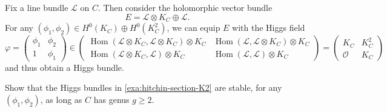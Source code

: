 \documentclass[12pt,letterpaper,reqno]{article}
\numberwithin{equation}{section}
\newcommand{\cL}{\ensuremath{\mathcal L}}
\newcommand{\cO}{\ensuremath{\mathcal O}}
\newcommand{\Z}{\ensuremath{\mathbb Z}}
\newcommand{\ti}[1]{\textit{#1}}
\DeclareMathOperator{\Hom}{Hom}
\begin{document}



\begin{example} \label{exa:hitchin-section-K2} 
Fix a line bundle
$\cL$ on $C$.
Then consider the holomorphic vector
bundle
\begin{equation}
  E = \cL \otimes K_C \oplus \cL.
\end{equation}
For any $(\phi_1, \phi_2) \in H^0(K_C) \oplus H^0(K_C^2)$,
we can equip $E$ with the Higgs field
\begin{equation}
  \varphi = \begin{pmatrix} \phi_1 & \phi_2 \\ 1 & \phi_1 \end{pmatrix} \in \begin{pmatrix} \Hom(\cL \otimes K_C,\cL \otimes K_C) \otimes K_C & \Hom(\cL,\cL \otimes K_C) \otimes K_C \\ \Hom(\cL \otimes K_C,\cL) \otimes K_C & \Hom(\cL,\cL) \otimes K_C \end{pmatrix} = \begin{pmatrix} K_C & K_C^2 \\ \cO & K_C \end{pmatrix}
\end{equation}
and thus obtain a Higgs bundle.
\end{example}

\begin{exercise}
Show that the Higgs bundles in \autoref{exa:hitchin-section-K2} are stable,
for any $(\phi_1,\phi_2)$,
as long as $C$ has genus $g \ge 2$.
\end{exercise}
\end{document}
